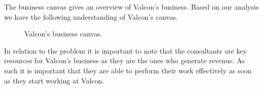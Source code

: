 The business canvas gives an overview of Valcon's business.
Based on our analysis we have the following understanding of Valcon's canvas.
\begin{figure}[!htp]
\caption{Valcon's business canvas.}
\label{fig:canvas}
\end{figure}

In relation to the problem it is important to note that the consultants are key resources for Valcon's business
as they are the ones who generate revenue.
As such it is important that they are able to perform their work effectively as soon as they start working at Valcon.